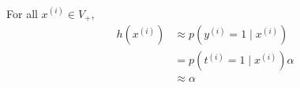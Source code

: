 \begin{answer}
	\\
	For all $x^{(i)} \in V_+$,
	$$
	\begin{aligned}
		h(x^{(i)}) & \approx p(y^{(i)} = 1 \mid x^{(i)})\\
		& = p(t^{(i)} = 1 \mid x^{(i)}) \alpha\\
		& \approx \alpha
	\end{aligned}
	$$
\end{answer}